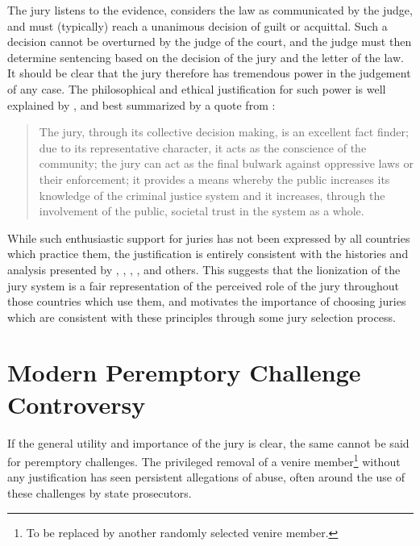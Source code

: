 The jury listens to the evidence, considers the law as communicated by the judge, and must (typically) reach a unanimous
decision of guilt or acquittal. Such a decision cannot be overturned by the judge of the court, and the judge must then determine
sentencing based on the decision of the jury and the letter of the law\footnotemark[\value{footnote}]. It should be clear that the
jury therefore has tremendous power in the judgement of any case. The philosophical and ethical justification for such power is
well explained by \cite{woolley2018}, and best summarized by a quote from \cite{rvsherratt}:


\begin{quote}
  The jury, through its collective decision making, is an excellent fact finder; due to its representative character, it acts as
  the conscience of the community; the jury can act as the final bulwark against oppressive laws or their enforcement; it provides
  a means whereby the public increases its knowledge of the criminal justice system and it increases, through the involvement of
  the public, societal trust in the system as a whole.
\end{quote}

While such enthusiastic support for juries has not been expressed by all countries which practice them, the justification is
entirely consistent with the histories and analysis presented by \cite{hoffman1997}, \cite{vonmosch1921}, \cite{hansvidjudging},
\cite{vandykejurysel}, and others. This suggests that the \cite{rvsherratt} lionization of the jury system is a fair
representation of the perceived role of the jury throughout those countries which use them, and motivates the importance of
choosing juries which are consistent with these principles through some jury selection process.

\section{Modern Peremptory Challenge Controversy} \label{sec:modper}

If the general utility and importance of the jury is clear, the same cannot be said for peremptory challenges. The privileged
removal of a venire member\footnote{To be replaced by another randomly selected venire member.} without any justification
has seen persistent allegations of abuse, often around the use of these challenges by state prosecutors.

